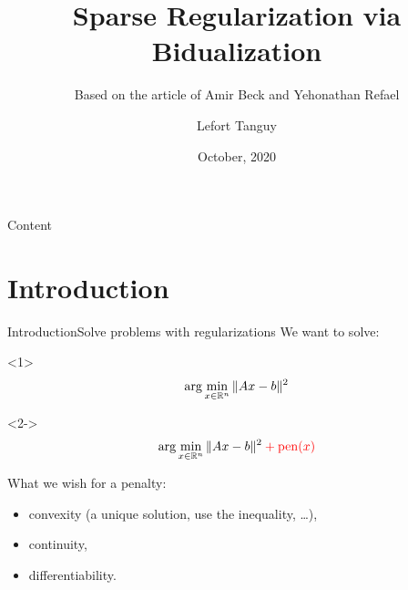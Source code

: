 \documentclass[10pt,aspectratio=43]{beamer}
\title[Regularization via Bidualization] %
	{Sparse Regularization via Bidualization} %
\subtitle{Based on the article of Amir Beck and Yehonathan Refael}
\date{October, 2020} %
\author[]%
	{%
		{Lefort Tanguy}%
	}
\institute[
	]
	{%
	    University of Montpellier
	}
\begin{document}
	\maketitle

	\begin{frame}{Content}{}
		\tableofcontents
	\end{frame}
	

\section{Introduction}
\begin{frame}{Introduction}{Solve problems with regularizations}
We want to solve:
\begin{onlyenv}<1>
\[\arg\min_{x\in\mathbb{R}^n} \|Ax-b\|^2  \]
\end{onlyenv}

\begin{onlyenv}<2->
\[\arg\min_{x\in\mathbb{R}^n} \|Ax-b\|^2 \color{red}+ \mathrm{pen}(x)\]

What we wish for a penalty:
\begin{itemize}
    \item convexity (a unique solution, use the inequality, \dots),
    \item continuity,
    \item differentiability.
\end{itemize}
\end{onlyenv}
\end{frame}

\end{document}

